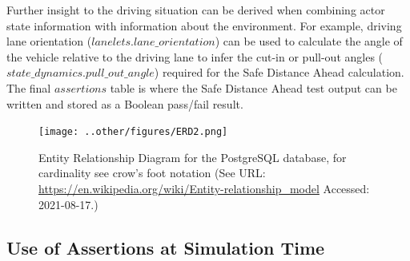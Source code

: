 Further insight to the driving situation can be derived when combining actor state information with information about the environment. For example, driving lane orientation ($lanelets.lane\_orientation$) can be used to calculate the angle of the vehicle relative to the driving lane to infer the cut-in or pull-out angles ($state\_dynamics.pull\_out\_angle$) required for the Safe Distance Ahead calculation. The final $assertions$ table is where the Safe Distance Ahead test output can be written and stored as a Boolean pass/fail result.

\begin{figure}[htp]
    \centering
    \texttt{[image: ..other/figures/ERD2.png]}
    \caption{Entity Relationship Diagram for the PostgreSQL database, for cardinality see crow's foot notation (See URL: \url{https://en.wikipedia.org/wiki/Entity-relationship\_model} Accessed: 2021-08-17.)}
    \label{fig:erd}
\end{figure}


\subsection{Use of Assertions at Simulation Time} \label{Assertions_at_Sim_Time}

